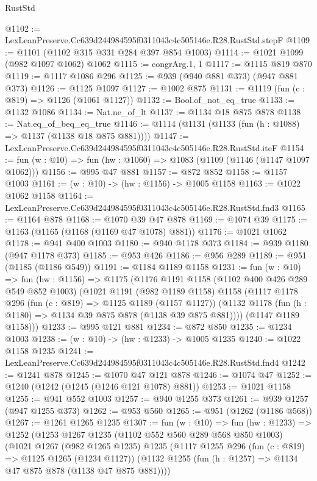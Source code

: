 \begin{lexlean}{RustStd}
\begin{coremodule}
@1102 := LexLeanPreserve.Cc639d244984595f0311043c4c505146e.R28.RustStd.stepF
@1109 := @1101 (@1102 @315 @331 @284 @397 @854 @1003)
@1114 := @1021 @1099 (@982 @1097 @1062) @1062
@1115 := congrArg.{1, 1}
@1117 := @1115 @819 @870
@1119 := @1117 @1086 @296
@1125 := @939 (@940 @881 @373) (@947 @881 @373)
@1126 := @1125 @1097
@1127 := @1002 @875
@1131 := @1119 (fun (c : @819) => @1126 (@1061 @1127))
@1132 := Bool.of_not_eq_true
@1133 := @1132 @1086
@1134 := Nat.ne_of_lt
@1137 := @1134 @18 @875 @878
@1138 := Nat.eq_of_beq_eq_true
@1146 := @1114 (@1131 (@1133 (fun (h : @1088) => @1137 (@1138 @18 @875 @881))))
@1147 := LexLeanPreserve.Cc639d244984595f0311043c4c505146e.R28.RustStd.iteF
@1154 := fun (w : @10) => fun (hw : @1060) => @1083 (@1109 (@1146 (@1147 @1097 @1062)))
@1156 := @995 @47 @881
@1157 := @872 @852
@1158 := @1157 @1003
@1161 := (w : @10) -> (hw : @1156) -> @1005 @1158
@1163 := @1022 @1062 @1158
@1164 := LexLeanPreserve.Cc639d244984595f0311043c4c505146e.R28.RustStd.fnd3
@1165 := @1164 @878
@1168 := @1070 @39 @47 @878
@1169 := @1074 @39
@1175 := @1163 (@1165 (@1168 (@1169 @47 @1078) @881))
@1176 := @1021 @1062
@1178 := @941 @400 @1003
@1180 := @940 @1178 @373
@1184 := @939 @1180 (@947 @1178 @373)
@1185 := @953 @426
@1186 := @956 @289
@1189 := @951 (@1185 (@1186 @549))
@1191 := @1184 @1189 @1158
@1231 := fun (w : @10) =>
  fun (hw : @1156) =>
  @1175
    (@1176
      @1191
      @1158
      (@1102 @400 @426 @289 @549 @852 @1003)
      (@1021
        @1191
        (@982 @1189 @1158)
        @1158
        (@1117
          @1178
          @296
          (fun (c : @819) => @1125 @1189 (@1157 @1127))
          (@1132 @1178 (fun (h : @1180) => @1134 @39 @875 @878 (@1138 @39 @875 @881))))
        (@1147 @1189 @1158)))
@1233 := @995 @121 @881
@1234 := @872 @850
@1235 := @1234 @1003
@1238 := (w : @10) -> (hw : @1233) -> @1005 @1235
@1240 := @1022 @1158 @1235
@1241 := LexLeanPreserve.Cc639d244984595f0311043c4c505146e.R28.RustStd.fnd4
@1242 := @1241 @878
@1245 := @1070 @47 @121 @878
@1246 := @1074 @47
@1252 := @1240 (@1242 (@1245 (@1246 @121 @1078) @881))
@1253 := @1021 @1158
@1255 := @941 @552 @1003
@1257 := @940 @1255 @373
@1261 := @939 @1257 (@947 @1255 @373)
@1262 := @953 @560
@1265 := @951 (@1262 (@1186 @568))
@1267 := @1261 @1265 @1235
@1307 := fun (w : @10) =>
  fun (hw : @1233) =>
  @1252
    (@1253
      @1267
      @1235
      (@1102 @552 @560 @289 @568 @850 @1003)
      (@1021
        @1267
        (@982 @1265 @1235)
        @1235
        (@1117
          @1255
          @296
          (fun (c : @819) => @1125 @1265 (@1234 @1127))
          (@1132 @1255 (fun (h : @1257) => @1134 @47 @875 @878 (@1138 @47 @875 @881))))

\end{coremodule}
\end{lexlean}
